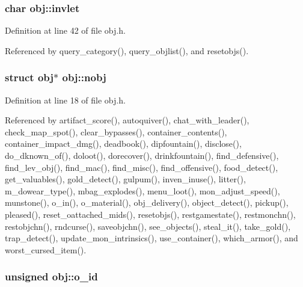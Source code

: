 \hypertarget{structobj_a15d874124e5aacf167531decaca972b8}{
\subsubsection[{invlet}]{\setlength{\rightskip}{0pt plus 5cm}char obj\+::invlet}}\label{structobj_a15d874124e5aacf167531decaca972b8}


Definition at line 42 of file obj.\+h.



Referenced by query\+\_\+category(), query\+\_\+objlist(), and resetobjs().

\hypertarget{structobj_ad1c5d790528ee1d8349ef302994789d8}{
\subsubsection[{nobj}]{\setlength{\rightskip}{0pt plus 5cm}struct {\bf obj}$\ast$ obj\+::nobj}}\label{structobj_ad1c5d790528ee1d8349ef302994789d8}


Definition at line 18 of file obj.\+h.



Referenced by artifact\+\_\+score(), autoquiver(), chat\+\_\+with\+\_\+leader(), check\+\_\+map\+\_\+spot(), clear\+\_\+bypasses(), container\+\_\+contents(), container\+\_\+impact\+\_\+dmg(), deadbook(), dipfountain(), disclose(), do\+\_\+dknown\+\_\+of(), doloot(), dorecover(), drinkfountain(), find\+\_\+defensive(), find\+\_\+lev\+\_\+obj(), find\+\_\+mac(), find\+\_\+misc(), find\+\_\+offensive(), food\+\_\+detect(), get\+\_\+valuables(), gold\+\_\+detect(), gulpum(), inven\+\_\+inuse(), litter(), m\+\_\+dowear\+\_\+type(), mbag\+\_\+explodes(), menu\+\_\+loot(), mon\+\_\+adjust\+\_\+speed(), munstone(), o\+\_\+in(), o\+\_\+material(), obj\+\_\+delivery(), object\+\_\+detect(), pickup(), pleased(), reset\+\_\+oattached\+\_\+mids(), resetobjs(), restgamestate(), restmonchn(), restobjchn(), rndcurse(), saveobjchn(), see\+\_\+objects(), steal\+\_\+it(), take\+\_\+gold(), trap\+\_\+detect(), update\+\_\+mon\+\_\+intrinsics(), use\+\_\+container(), which\+\_\+armor(), and worst\+\_\+cursed\+\_\+item().

\hypertarget{structobj_a07e744e962a5f52bc93864a4bdd16840}{
\subsubsection[{o\+\_\+id}]{\setlength{\rightskip}{0pt plus 5cm}unsigned obj\+::o\+\_\+id}}\label{structobj_a07e744e962a5f52bc93864a4bdd16840}


